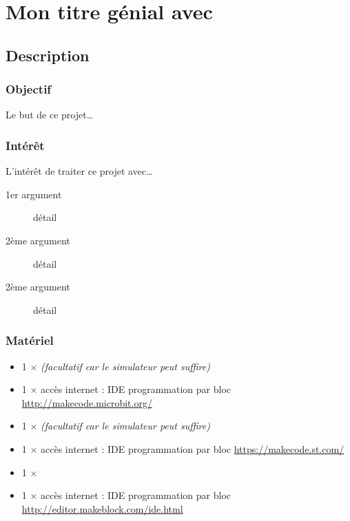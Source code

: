 

\section{Mon titre génial avec \mb}




\subsection{Description}

\subsubsection{Objectif}


\begin{formule}
Le but de ce projet\ldots
\end{formule}


\subsubsection{Intérêt}

L'intérêt de traiter ce projet avec\ldots

\begin{description}
    \item [1er argument] détail
    \item [2ème argument] détail
    \item [2ème argument] détail
\end{description}


\subsubsection{Matériel}
\begin{itemize}
    \item 1 $\times$ \matosMb \emph{(facultatif car le simulateur peut suffire)}
    \item 1 $\times$ accès internet : IDE programmation par bloc \url{http://makecode.microbit.org/}
    \item 1 $\times$ \matosSt \emph{(facultatif car le simulateur peut suffire)}
   \item 1 $\times$ accès internet : IDE programmation par bloc \url{https://makecode.st.com/}
    \item 1 $\times$ \matosMbot
   \item 1 $\times$ accès internet : IDE programmation par bloc \url{http://editor.makeblock.com/ide.html}
\end{itemize}



